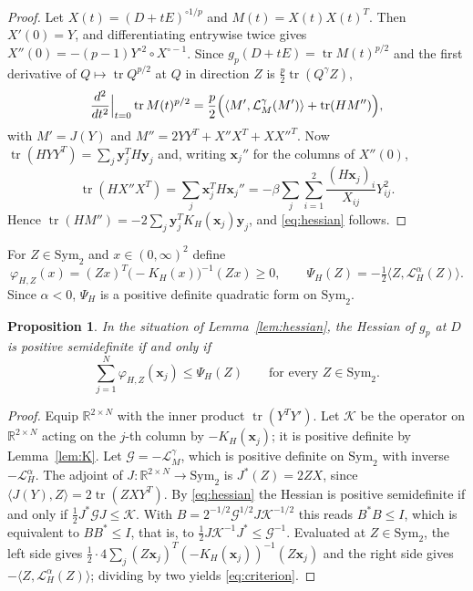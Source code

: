 \documentclass[11pt]{amsart}
\newtheorem{proposition}[theorem]{Proposition}
\theoremstyle{definition}
\theoremstyle{remark}
\numberwithin{equation}{section}
\newcommand{\R}{\mathbb{R}}
\newcommand{\tr}{\operatorname{tr}}
\newcommand{\Sym}{\mathrm{Sym}_2}
\newcommand{\cL}{\mathcal{L}}
\newcommand{\cK}{\mathcal{K}}
\newcommand{\ip}[2]{\langle #1,#2\rangle}
\newcommand{\bx}{\mathbf{x}}
\newcommand{\by}{\mathbf{y}}
\begin{document}
\begin{proof}
Let $X(t)=(D+tE)^{\circ1/p}$ and $M(t)=X(t)X(t)^T$. Then $X'(0)=Y$, and differentiating entrywise twice gives $X''(0)=-(p-1)Y^{\circ2}\circ X^{\circ-1}$. Since $g_p(D+tE)=\tr M(t)^{p/2}$ and the first derivative of $Q\mapsto\tr Q^{p/2}$ at $Q$ in direction $Z$ is $\frac p2\tr(Q^\gamma Z)$,
\[
\frac{d^2}{dt^2}\Big|_{t=0}\tr M(t)^{p/2}=\frac p2\Bigl(\ip{M'}{\cL^\gamma_M(M')}+\tr(HM'')\Bigr),
\]
with $M'=J(Y)$ and $M''=2YY^T+X''X^T+XX''^T$. Now $\tr(HYY^T)=\sum_j\by_j^TH\by_j$ and, writing $\bx_j''$ for the columns of $X''(0)$,
\[
\tr(HX''X^T)=\sum_j \bx_j^TH\bx_j''=-\beta\sum_j\sum_{i=1}^2\frac{(H\bx_j)_i}{X_{ij}}Y_{ij}^2 .
\]
Hence $\tr(HM'')=-2\sum_j\by_j^TK_H(\bx_j)\by_j$, and \eqref{eq:hessian} follows.
\end{proof}

For $Z\in\Sym$ and $x\in(0,\infty)^2$ define
\begin{equation}\label{eq:phipsi}
\varphi_{H,Z}(x)=(Zx)^T\bigl(-K_H(x)\bigr)^{-1}(Zx)\ge0,\qquad \Psi_H(Z)=-\tfrac12\ip Z{\cL^\alpha_H(Z)}.
\end{equation}
Since $\alpha<0$, $\Psi_H$ is a positive definite quadratic form on $\Sym$.

\begin{proposition}\label{prop:criterion}
In the situation of Lemma~\ref{lem:hessian}, the Hessian of $g_p$ at $D$ is positive semidefinite if and only if
\begin{equation}\label{eq:criterion}
\sum_{j=1}^N\varphi_{H,Z}(\bx_j)\le\Psi_H(Z)\qquad\text{for every }Z\in\Sym .
\end{equation}
\end{proposition}

\begin{proof}
Equip $\R^{2\times N}$ with the inner product $\tr(Y^TY')$. Let $\cK$ be the operator on $\R^{2\times N}$ acting on the $j$-th column by $-K_H(\bx_j)$; it is positive definite by Lemma~\ref{lem:K}. Let $\mathcal G=-\cL^\gamma_M$, which is positive definite on $\Sym$ with inverse $-\cL^\alpha_H$. The adjoint of $J\colon\R^{2\times N}\to\Sym$ is $J^*(Z)=2ZX$, since $\ip{J(Y)}Z=2\tr(ZXY^T)$. By \eqref{eq:hessian} the Hessian is positive semidefinite if and only if $\frac12J^*\mathcal GJ\le\cK$. With $B=2^{-1/2}\mathcal G^{1/2}J\cK^{-1/2}$ this reads $B^*B\le I$, which is equivalent to $BB^*\le I$, that is, to $\frac12J\cK^{-1}J^*\le\mathcal G^{-1}$. Evaluated at $Z\in\Sym$, the left side gives $\frac12\cdot4\sum_j(Z\bx_j)^T(-K_H(\bx_j))^{-1}(Z\bx_j)$ and the right side gives $-\ip Z{\cL^\alpha_H(Z)}$; dividing by two yields \eqref{eq:criterion}.
\end{proof}
\end{document}

